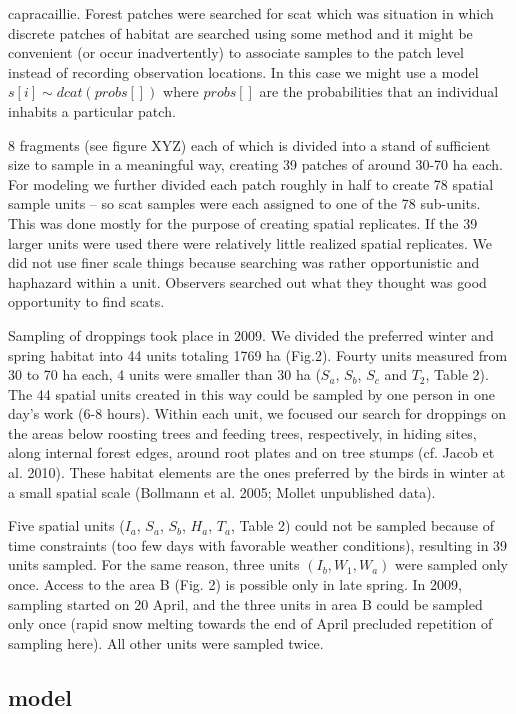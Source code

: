 {capracaillie. Forest patches were searched for scat which was
situation in which discrete patches of habitat are searched using some
method and it might be convenient (or occur inadvertently) to
associate samples to the patch level instead of recording observation
locations. In this case we might use a model $s[i] \sim dcat(probs[])$
where $probs[]$ are the probabilities that an individual inhabits a
particular patch.

8 fragments (see figure XYZ) each of which is divided into a stand of 
sufficient size to sample in a meaningful way, creating 39 patches of around
30-70 ha each. For modeling we further divided each patch roughly in half to
create 78 spatial sample units -- so scat samples were each assigned to one of
the 78 sub-units. This was done mostly for the purpose of creating spatial
replicates. If the 39 larger units were used there were relatively little
realized spatial replicates. 
We did not use finer scale things because searching was rather opportunistic
and haphazard within a unit. Observers searched out what they thought was
good opportunity to find scats.  

Sampling of droppings took place in 2009. We divided the preferred winter 
and spring habitat into 44 units totaling 1769 ha (Fig.2). Fourty units
 measured from 30 to 70 ha each, 4 units were smaller than 30 ha 
 ($S_a$, $S_b$, $S_c$ and $T_2$, Table 2). The 44 spatial units created in this way
  could be sampled by one person in one day's work (6-8 hours). Within 
  each unit, we focused our search for droppings on the areas below 
  roosting trees and feeding trees, respectively, in hiding sites, along internal forest edges, around root plates and on tree stumps (cf. Jacob et al. 2010). These habitat elements are the ones preferred by the birds in winter at a small spatial scale (Bollmann et al. 2005; Mollet unpublished data).

Five spatial units ($I_a$, $S_a$, $S_b$, $H_a$, $T_a$, Table 2) could not be sampled
because of time constraints (too few days with favorable weather conditions),
resulting in 39 units sampled. For the same reason, three units $(I_b, W_1,
W_a)$ were sampled only once. Access to the area B (Fig. 2) is possible only in
late spring. In 2009, sampling started on 20 April, and the three units in
area B could be sampled only once (rapid snow melting towards the end of April
precluded repetition of sampling here). All other units were sampled twice.

\subsection{model}

}
